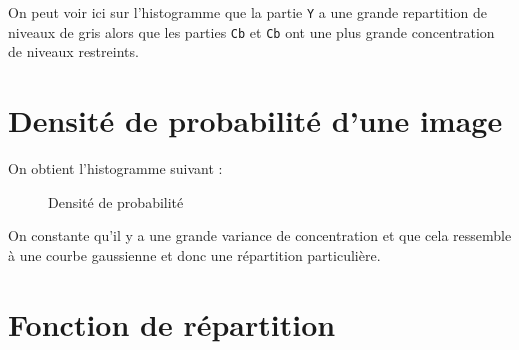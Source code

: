 \documentclass[french,a4paper,10pt]{article}
\begin{document}
    On peut voir ici sur l'histogramme que la partie \texttt{Y} a une grande repartition de niveaux
    de gris alors que les parties \texttt{Cb} et \texttt{Cb} ont une plus grande concentration de
    niveaux restreints.

    \newpage

    \section{Densité de probabilité d'une image}\label{sec:2}

    On obtient l'histogramme suivant :
    \begin{figure}[!htb]
        \begin{minipage}{0.48\textwidth}
            \centering
            \caption{Densité de probabilité}\label{Fig:orig-peppers-4}
        \end{minipage}\hfill
    \end{figure}

    On constante qu'il y a une grande variance de concentration et que cela ressemble
    à une courbe gaussienne et donc une répartition particulière.

    \newpage
    \section{Fonction de répartition}\label{sec:3}
\end{document}
